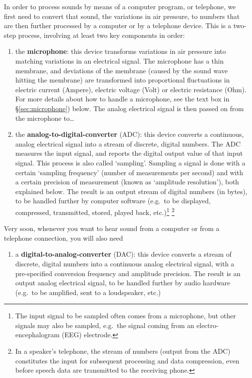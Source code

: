 \documentclass[
]{book}
\providecommand{\tightlist}{%
  \setlength{\itemsep}{0pt}\setlength{\parskip}{0pt}}
\begin{document}
In order to process sounds by means of a computer program, or telephone, we first need to convert that sound, the variations in air pressure, to numbers that are then further processed by a computer or by a telephone device. This is a two-step process, involving at least two key components in order:

\begin{enumerate}
\def\labelenumi{(\arabic{enumi})}
\item
  the \textbf{microphone}: this device transforms variations in air pressure into matching variations in an electrical signal. The microphone has a thin membrane, and deviations of the membrane (caused by the sound wave hitting the membrane) are transformed into proportional fluctuations in electric current (Ampere), electric voltage (Volt) or electric resistance (Ohm). For more details about how to handle a microphone, see the text box in §\ref{sec:microphone}) below.
  The analog electrical signal is then passed on from the microphone to\ldots{}
\item
  the \textbf{analog-to-digital-converter} (ADC): this device converts a continuous, analog electrical signal into a stream of discrete, digital numbers. The ADC measures the input signal, and reports the digital output value of that input signal. This process is also called `sampling'. Sampling a signal is done with a certain `sampling frequency' (number of measurements per second) and with a certain precision of measurement (known as `amplitude resolution'), both explained below. The result is an output stream of digital numbers (in bytes), to be handled further by computer software (e.g.~to be displayed, compressed, transmitted, stored, played back, etc.)\footnote{The input signal to be sampled often comes from a microphone, but other signals may also be sampled, e.g.~the signal coming from an electro-encephalogram (EEG) electrode.} \footnote{In a speaker's telephone, the stream of numbers (output from the ADC) constitutes the input for subsequent processing and data compression, even before speech data are transmitted to the receiving phone.}
\end{enumerate}

Very soon, whenever you want to hear sound from a computer or from a telephone connection, you will also need

\begin{enumerate}
\def\labelenumi{(\arabic{enumi})}
\setcounter{enumi}{2}
\tightlist
\item
  a \textbf{digital-to-analog-converter} (DAC): this device converts a stream of discrete, digital numbers into a continuous analog electrical signal, with a pre-specified conversion frequency and amplitude precision. The result is an output analog electrical signal, to be handled further by audio hardware (e.g.~to be amplified, sent to a loudspeaker, etc.)
\end{enumerate}
\end{document}
